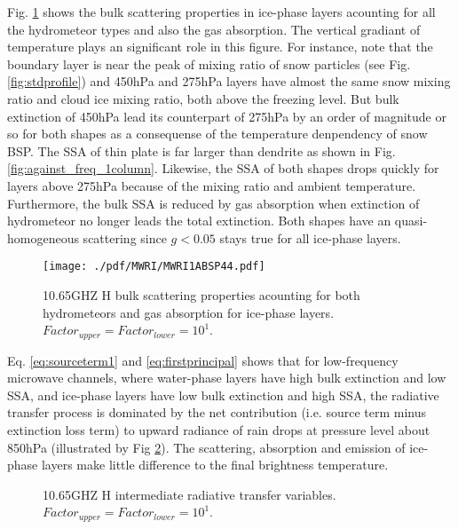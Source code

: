 \documentclass[a4paper]{report}
\begin{document}
Fig. \ref{fig:MWRI1ABSP44} shows the bulk scattering properties in ice-phase layers acounting for all the hydrometeor types and also the
gas absorption. The vertical gradiant of temperature plays an significant role in this figure. For instance, note that the boundary layer is near 
the peak of mixing ratio of snow particles (see Fig. \ref{fig:stdprofile}) and 450hPa and 275hPa layers have almost the same snow mixing ratio 
and cloud ice mixing ratio, both above the freezing level. But bulk extinction of 450hPa lead its counterpart of 275hPa by an order of magnitude or so
for both shapes as a consequense of the temperature denpendency of snow BSP.
The SSA of thin plate is far larger than dendrite as shown in Fig. \ref{fig:against_freq_1column}. Likewise, the SSA of both shapes drops quickly
for layers above 275hPa because of the mixing ratio and ambient temperature. 
Furthermore, the bulk SSA is reduced by gas absorption when extinction of hydrometeor no longer leads the total extinction.
Both shapes have an quasi-homogeneous scattering since $g < 0.05$ stays true for all ice-phase layers.

\begin{figure}[hbtp] 
\centering
\texttt{[image: ./pdf/MWRI/MWRI1ABSP44.pdf]}
\caption{10.65GHZ H bulk scattering properties acounting for both hydrometeors and gas absorption for ice-phase layers.
$Factor_{upper} = Factor_{lower} = 10^{1}$.}
\label{fig:MWRI1ABSP44}
\end{figure}

Eq. \ref{eq:sourceterm1} and \ref{eq:firstprincipal} shows that for low-frequency microwave channels, where water-phase layers have high bulk extinction and low SSA,
and ice-phase layers have low bulk extinction and high SSA, the radiative transfer process is dominated by the net contribution (i.e. source term minus extinction loss term) to 
upward radiance of rain drops at pressure level about 850hPa (illustrated by Fig \ref{fig:MWRI1rad}). The scattering, absorption and emission of ice-phase layers make little difference
to the final brightness temperature.

\begin{figure}[hbtp] 
\centering
{}
\caption{10.65GHZ H intermediate radiative transfer variables. $Factor_{upper} = Factor_{lower} = 10^{1}$.}
\label{fig:MWRI1rad}
\end{figure}
\end{document}
